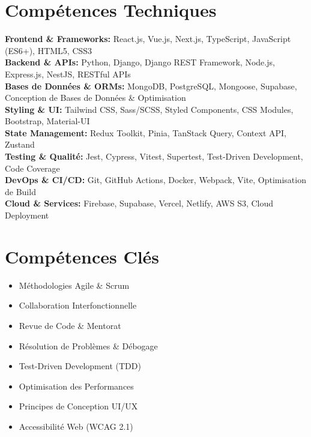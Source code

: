 \documentclass[10pt,a4paper]{article}
\begin{document}
\section*{Compétences Techniques}

\noindent
\textbf{\color{darkgray}Frontend \& Frameworks:} React.js, Vue.js, Next.js, TypeScript, JavaScript (ES6+), HTML5, CSS3 \\
\textbf{\color{darkgray}Backend \& APIs:} Python, Django, Django REST Framework, Node.js, Express.js, NestJS, RESTful APIs \\
\textbf{\color{darkgray}Bases de Données \& ORMs:} MongoDB, PostgreSQL, Mongoose, Supabase, Conception de Bases de Données \& Optimisation \\
\textbf{\color{darkgray}Styling \& UI:} Tailwind CSS, Sass/SCSS, Styled Components, CSS Modules, Bootstrap, Material-UI \\
\textbf{\color{darkgray}State Management:} Redux Toolkit, Pinia, TanStack Query, Context API, Zustand \\
\textbf{\color{darkgray}Testing \& Qualité:} Jest, Cypress, Vitest, Supertest, Test-Driven Development, Code Coverage \\
\textbf{\color{darkgray}DevOps \& CI/CD:} Git, GitHub Actions, Docker, Webpack, Vite, Optimisation de Build \\
\textbf{\color{darkgray}Cloud \& Services:} Firebase, Supabase, Vercel, Netlify, AWS S3, Cloud Deployment

\section*{Compétences Clés}

\noindent
\begin{minipage}[t]{0.48\textwidth}
  \begin{itemize}
    \item Méthodologies Agile \& Scrum
    \item Collaboration Interfonctionnelle
    \item Revue de Code \& Mentorat
    \item Résolution de Problèmes \& Débogage
  \end{itemize}
\end{minipage}%
\hfill
\begin{minipage}[t]{0.48\textwidth}
  \begin{itemize}
    \item Test-Driven Development (TDD)
    \item Optimisation des Performances
    \item Principes de Conception UI/UX
    \item Accessibilité Web (WCAG 2.1)
  \end{itemize}
\end{minipage}
\end{document}
